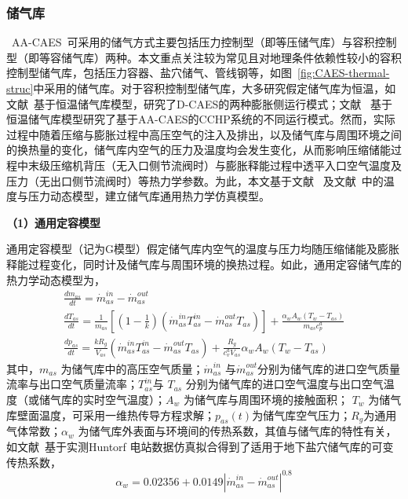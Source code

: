 \subsubsection{储气库}
\label{sec:Air-tank-thermo-model}
~AA-CAES~可采用的储气方式主要包括压力控制型（即等压储气库）\cite{Isobaric-ACAES-18,Thesis-Wangzhiwen}与容积控制型（即等容储气库）\cite{TICC-15,Thesis-JaiDuhan}两种。本文重点关注较为常见且对地理条件依赖性较小的容积控制型储气库，包括压力容器\cite{TICC-15}、盐穴储气\cite{CAES-Review-17-Rui-salt}、管线钢\cite{ST-CAES-CN-16-Rui}等，如图~\ref{fig:CAES-thermal-struc}中采用的储气库。对于容积控制型储气库，大多研究假定储气库为恒温，如文献~基于恒温储气库模型，研究了D-CAES的两种膨胀侧运行模式；文献~ 基于恒温储气库模型研究了基于AA-CAES的CCHP系统的不同运行模式。然而，实际过程中随着压缩与膨胀过程中高压空气的注入及排出，以及储气库与周围环境之间的换热量的变化，储气库内空气的压力及温度均会发生变化，从而影响压缩储能过程中末级压缩机背压（无入口侧节流阀时）与膨胀释能过程中透平入口空气温度及压力（无出口侧节流阀时）等热力学参数。为此，本文基于文献~ 及文献~中的温度与压力动态模型，建立储气库通用热力学仿真模型。

\textbf{（1）通用定容模型}

通用定容模型（记为G模型）假定储气库内空气的温度与压力均随压缩储能及膨胀释能过程变化，同时计及储气库与周围环境的换热过程。如此，通用定容储气库的热力学动态模型为\cite{Model-AA-CAES-10,Cavern-model-12}，
\begin{subequations}
\label{equ:Air-tank-model-G}
\begin{gather}
   \frac{{d{m_{as}}}}{{dt}} = \dot m_{as}^{in} - \dot m_{as}^{out}\\
   \frac{{d{T_{as}}}}{{dt}} = \frac{1}{{{m_{as}}}}[ {({1 - \frac{1}{k}})({\dot m_{as}^{in}T_{as}^{in} - \dot m_{as}^{out}T_{as}^{}})} ] + \frac{{{\alpha _w}{A_w}({{T_w} - {T_{as}}})}}{{{m_{as}}c_p^a}}\label{equ:Air-tank-model-G-T}\\
   \frac{{d{p_{as}}}}{{dt}} = \frac{{k{R_g}}}{{{V_{as}}}}({\dot m_{as}^{in}T_{as}^{in} - \dot m_{as}^{out}T_{as}^{}}) + \frac{{{R_g}}}{{c_v^a{V_{as}}}}{\alpha _w}{A_w}({{T_w} - {T_{as}}} )\label{equ:Air-tank-model-G-P}
\end{gather}
\end{subequations}
其中，${m_{as}}$ 为储气库中的高压空气质量；$\dot m_{as}^{in}$ 与$\dot m_{as}^{out}$分别为储气库的进口空气质量流率与出口空气质量流率；$T_{as}^{in}$与 $T_{as}$ 分别为储气库的进口空气温度与出口空气温度（或储气库的实时空气温度）；${A_w}$ 为储气库与周围环境的接触面积； ${T_w}$ 为储气库壁面温度，可采用一维热传导方程求解；$p_{as}(t)$为储气库空气压力；$R_g$为通用气体常数；${\alpha _w}$ 为储气库外表面与环境间的传热系数，其值与储气库的特性有关，如文献~基于实测Huntorf 电站数据仿真拟合得到了适用于地下盐穴储气库的可变传热系数，
\begin{equation}
\label{equ:wall-thermal-coef}
{\alpha _w} = 0.02356 + 0.0149{\left| {\dot m_{as}^{in} - \dot m_{as}^{out}} \right|^{0.8}}
\end{equation}

